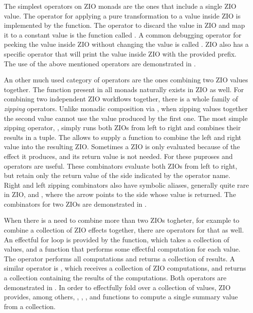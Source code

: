 

The simplest operators on ZIO monads are the ones that include a single ZIO value. The operator for applying a pure transformation to a value inside ZIO is implemented by the  function. The operator to discard the value in ZIO and map it to a constant value is the function called . A common debugging operator for peeking the value inside ZIO without changing the value is called . ZIO also has a specific  operator that will print the value inside ZIO with the provided prefix. The use of the above mentioned operators are demonstrated in .



An other much used category of operators are the ones combining two ZIO values together. The  function present in all monads naturally exists in ZIO as well. For combining two independent ZIO workflows together, there is a whole family of \emph{zipping} operators. Unlike monadic composition via , when zipping values together the second value cannot use the value produced by the first one. The most simple zipping operator, , simply runs both ZIOs from left to right and combines their results in a tuple. The  allows to supply a function to combine the left and right value into the resulting ZIO. Sometimes a ZIO is only evaluated because of the effect it produces, and its return value is not needed. For these puproses  and  operators are useful. These combinators evaluate both ZIOs from left to right, but retain only the return value of the side indicated by the operator name. Right and left zipping combinators also have symbolic aliases, generally quite rare in ZIO, \inlinecode{*>} and \inlinecode{<*}, where the arrow points to the side whose value is returned. The combinators for two ZIOs are demonstrated in .



When there is a need to combine more than two ZIOs togheter, for example to combine a collection of ZIO effects together, there are operators for that as well. An effectful for loop is provided by the  function, which takes a collection of values, and a function that performs some effectful computation for each value. The operator performs all computations and returns a collection of results. A similar operator is , which receives a collection of ZIO computations, and returns a collection containing the results of the computations. Both operators are demonstrated in . In order to effectfully fold over a collection of values, ZIO provides, among others, , , , and   functions to compute a single summary value from a collection.

